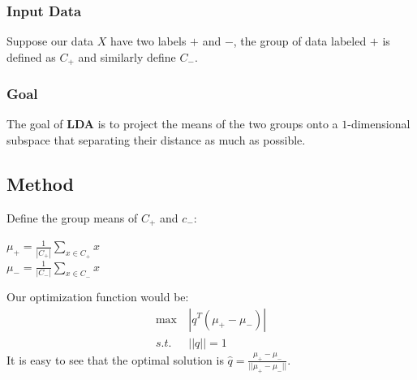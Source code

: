 \subsubsection{Input Data}
Suppose our data $X$ have two labels $+$ and $-$, the group of data labeled $+$ is defined as $C_{+}$ and similarly define $C_{-}$.

\subsubsection{Goal}
The goal of \textbf{LDA} is to project the means of the two groups onto a $1$-dimensional subspace that separating their distance as much as possible.


\subsection{Method}
 Define the group means of $C_{+}$ and $c_{-}$:
\begin{center}
	$\mu_{+} = \frac{1}{|C_{+}|}\sum\limits_{x \in C_{+}}x$\\
	$\mu_{-} = \frac{1}{|C_{-}|}\sum\limits_{x \in C_{-}}x$
\end{center}
Our optimization function would be:
\begin{align*}
\max & \ |q^T(\mu_{+}-\mu_{-})|\\
s.t. & \ ||q|| = 1
\end{align*}
It is easy to see that the optimal solution is $\hat{q} = \frac{\mu_{+}-\mu_{-}}{||\mu_{+}-\mu_{-}||}$.\\

